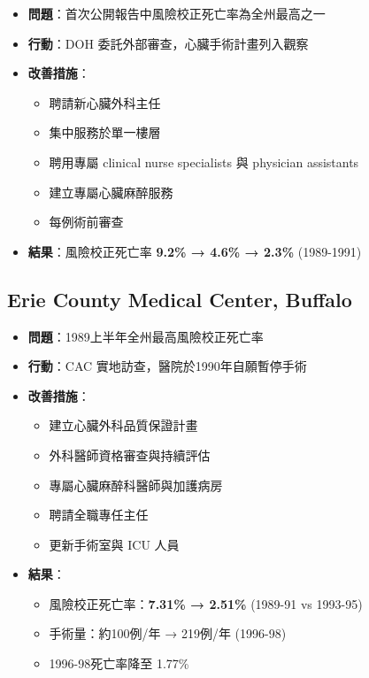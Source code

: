 \documentclass[12pt,a4paper]{article}
\begin{document}
\begin{itemize}
    \item \textbf{問題}：首次公開報告中風險校正死亡率為全州最高之一
    \item \textbf{行動}：DOH 委託外部審查，心臟手術計畫列入觀察
    \item \textbf{改善措施}：
    \begin{itemize}
        \item 聘請新心臟外科主任
        \item 集中服務於單一樓層
        \item 聘用專屬 clinical nurse specialists 與 physician assistants
        \item 建立專屬心臟麻醉服務
        \item 每例術前審查
    \end{itemize}
    \item \textbf{結果}：風險校正死亡率 \textbf{9.2\% → 4.6\% → 2.3\%} (1989-1991)
\end{itemize}

\subsection{Erie County Medical Center, Buffalo}

\begin{itemize}
    \item \textbf{問題}：1989上半年全州最高風險校正死亡率
    \item \textbf{行動}：CAC 實地訪查，醫院於1990年自願暫停手術
    \item \textbf{改善措施}：
    \begin{itemize}
        \item 建立心臟外科品質保證計畫
        \item 外科醫師資格審查與持續評估
        \item 專屬心臟麻醉科醫師與加護病房
        \item 聘請全職專任主任
        \item 更新手術室與 ICU 人員
    \end{itemize}
    \item \textbf{結果}：
    \begin{itemize}
        \item 風險校正死亡率：\textbf{7.31\% → 2.51\%} (1989-91 vs 1993-95)
        \item 手術量：約100例/年 → 219例/年 (1996-98)
        \item 1996-98死亡率降至 1.77\%
    \end{itemize}
\end{itemize}
\end{document}
